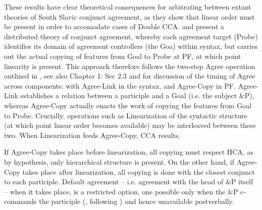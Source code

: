 \documentclass[output=paper
,modfonts
,nonflat]{langsci/langscibook}
\begin{document}
\begin{exe} 
\ex
\begin{xlist}
\end{xlist}
\end{exe}
These results have clear theoretical consequences for arbitrating between extant theories of South Slavic conjunct agreement, as they show that linear order must be present in order to accomodate cases of Double CCA. \cite{marusicnevinsbadecker:15} and \cite{willergold:16} present a distributed theory of conjunct agreement, whereby each agreement target (Probe) identifies its domain of agreement controllers (the Goa) within syntax, but carries out the actual copying of features from Goal to Probe at PF, at which point linearity is present. This approach therefore follows the two-step Agree operation outlined in  \citet{arregi-nevins:12}, see also Chapter 1: Sec 2.3 and  for discussion of the timing of Agree across components: with Agree-Link in the syntax, and Agree-Copy in PF. Agree-Link establishes a relation between a participle and a Goal (i.e. the subject \&P), whereas Agree-Copy actually enacts the work of copying the features from Goal to Probe. Crucially, operations such as Linearization of the syntactic structure (at which point linear order becomes available) may be interleaved between these two. When Linearization feeds Agree-Copy, CCA results. 

If Agree-Copy takes place before linearization, all copying must respect HCA, as by hypothesis, only hierarchical structure is present. On the other hand, if Agree-Copy takes place after linearization, all copying is done with the closest conjunct to each participle. Default agreement -- i.e. agreement with the head of \&P itself --  when it takes place, is a restricted option, one possible only when the \&P c-commands the participle (\citealt{willergold:16}, following \citealt{smith:17a}) and hence unavailable postverbally.
\end{document}

